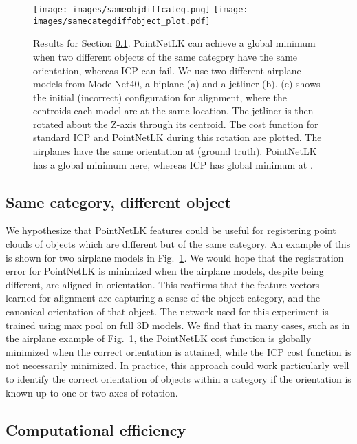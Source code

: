 \documentclass[10pt,twocolumn,letterpaper]{article}
\begin{document}
\begin{figure}[htbp]
\centering
\texttt{[image: images/sameobjdiffcateg.png]}
\texttt{[image: images/samecategdiffobject\_plot.pdf]}
\caption{Results for Section \ref{same_categ_diff_object}. PointNetLK can achieve a global minimum when two different objects of the same category have the same orientation, whereas ICP can fail. We use two different airplane models from ModelNet40, a biplane (a) and a jetliner (b). (c) shows the initial (incorrect) configuration for alignment, where the centroids each model are at the same location. The jetliner is then rotated about the Z-axis through its centroid. The cost function for standard ICP and PointNetLK during this rotation are plotted. The airplanes have the same orientation at  (ground truth). PointNetLK has a global minimum here, whereas ICP has global minimum at .}
\label{fig_same_categ_diff_object}
\end{figure}

\subsection{Same category, different object} \label{same_categ_diff_object}

We hypothesize that PointNetLK features could be useful for registering point clouds of objects which are different but of the same category. An example of this is shown for two airplane models in Fig.~\ref{fig_same_categ_diff_object}. We would hope that the registration error for PointNetLK  is minimized when the airplane models, despite being different, are aligned in orientation. This reaffirms that the feature vectors learned for alignment are capturing a sense of the object category, and the canonical orientation of that object. The network used for this experiment is trained using max pool on full 3D models. We find that in many cases, such as in the airplane example of Fig.~\ref{fig_same_categ_diff_object}, the PointNetLK cost function is globally minimized when the correct orientation is attained, while the ICP cost function is not necessarily minimized. In practice, this approach could work particularly well to identify the correct orientation of objects within a category if the orientation is known up to one or two axes of rotation. 


\subsection{Computational efficiency}
\end{document}
